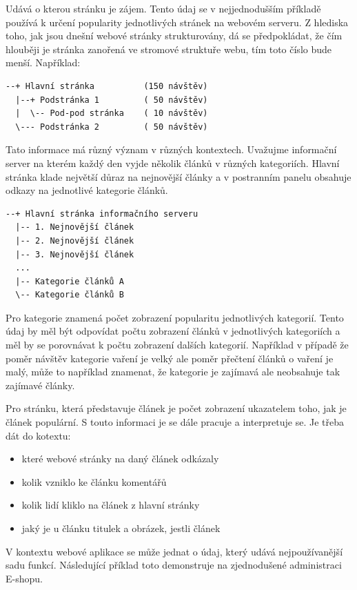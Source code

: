 \documentclass[bc,female,java,dept456]{diploma}						%
\begin{document}
Udává o kterou stránku je zájem. Tento údaj se v nejjednodušším příkladě používá k určení popularity jednotlivých stránek na webovém serveru. Z hlediska toho, jak jsou dnešní webové stránky strukturovány, dá se předpokládat, že čím hlouběji je stránka zanořená ve stromové struktuře webu, tím toto číslo bude menší. Například:

\begin{verbatim}
--+ Hlavní stránka 			(150 návštěv)
  |--+ Podstránka 1			( 50 návštěv)
  |  \-- Pod-pod stránka	( 10 návštěv)
  \--- Podstránka 2			( 50 návštěv)
\end{verbatim}

Tato informace má různý význam v různých kontextech. Uvažujme informační server na kterém každý den vyjde několik článků v různých kategoriích. Hlavní stránka klade největší důraz na nejnovější články a v postranním panelu obsahuje odkazy na jednotlivé kategorie článků.

\begin{verbatim}
--+ Hlavní stránka informačního serveru		
  |-- 1. Nejnovější článek
  |-- 2. Nejnovější článek		
  |-- 3. Nejnovější článek	
  ...
  |-- Kategorie článků A
  \-- Kategorie článků B  
\end{verbatim}

Pro kategorie znamená počet zobrazení popularitu jednotlivých kategorií. Tento údaj by měl být odpovídat počtu zobrazení článků v jednotlivých kategoriích a měl by se porovnávat k počtu zobrazení dalších kategorií. Například v případě že poměr návštěv kategorie vaření je velký ale poměr přečtení článků o vaření je malý, může to například znamenat, že kategorie je zajímavá ale neobsahuje tak zajímavé články.

Pro stránku, která představuje článek je počet zobrazení ukazatelem toho, jak je článek populární. S touto informaci je se dále pracuje a interpretuje se. Je třeba dát do kotextu:
\begin{itemize}
  \item{které webové stránky na daný článek odkázaly}
  \item{kolik vzniklo ke článku komentářů}
  \item{kolik lidí kliklo na článek z hlavní stránky}
  \item{jaký je u článku titulek a obrázek, jestli článek}
\end{itemize}


V kontextu webové aplikace se může jednat o údaj, který udává nejpoužívanější sadu funkcí. Následující příklad toto demonstruje na zjednodušené administraci E-shopu.
\end{document}
